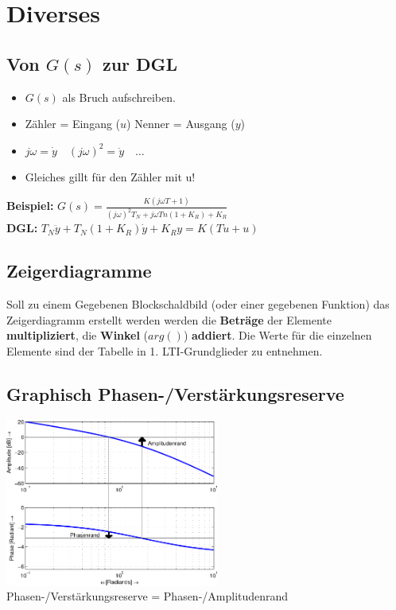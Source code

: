 \section{Diverses}
    \subsection{Von $G(s)$ zur DGL}
    	\begin{multicols}{2}
    		\begin{itemize}
  				\item $G(s)$ als Bruch aufschreiben.
  				\item Zähler = Eingang ($u$) \quad Nenner = Ausgang ($y$)
  				\item $j\omega = \dot{y} \quad (j\omega)^2 = \ddot{y} \quad \ldots $
  				\item Gleiches gillt für den Zähler mit u!
			\end{itemize}
			\columnbreak
			\textbf{Beispiel:} $G(s) = \frac{K(j \omega T + 1)}{(j\omega)^2 T_N + j \omega Tn(1+K_R) + K_R}$ \\			
			\textbf{DGL:} $T_N \ddot{y} + T_N(1+K_R) \dot{y} + K_R y = K(T \dot{u} + u)$
    	\end{multicols}    	
    
    \subsection{Zeigerdiagramme}
    Soll zu einem Gegebenen Blockschaldbild (oder einer gegebenen Funktion) das Zeigerdiagramm erstellt 
    werden werden die \textbf{Beträge} der Elemente \textbf{multipliziert},
    die \textbf{Winkel} ($arg()$) \textbf{addiert}. Die Werte für die einzelnen Elemente sind der Tabelle in 1. LTI-Grundglieder zu entnehmen. 


	\subsection{Graphisch Phasen-/Verstärkungsreserve}
		\includegraphics[width=7cm]{./bilder/bode-stabilitaet.png} \\
		Phasen-/Verstärkungsreserve = Phasen-/Amplitudenrand

